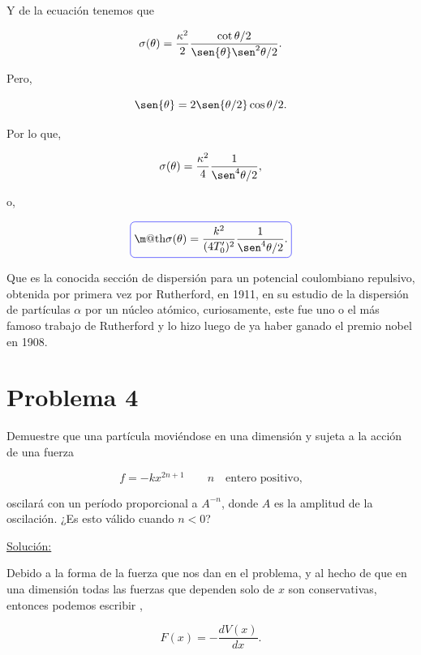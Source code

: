 \documentclass[a4paper,10pt]{article}
\makeatletter
\numberwithin{equation}{section}
\newcommand*{\boxcolor}{blue}
\renewcommand{\boxed}[1]{\textcolor{\boxcolor}{%
\tikz[baseline={([yshift=-1ex]current bounding box.center)}] \node [rectangle, minimum width=1ex,rounded corners,draw] {\normalcolor\m@th$\displaystyle#1$};}}
\makeatother
\begin{document}
Y de la ecuación  tenemos que 

\begin{equation}
 \sigma (\theta) = \frac{\kappa^2}{2}\frac{\cot{\theta/2}}{\sen{\theta}\sen^2{\theta/2}}.
\end{equation}

Pero,

\begin{equation}
 \sen{\theta} = 2\sen{\theta/2}\cos{\theta/2}.
\end{equation}

Por lo que,

\begin{equation}
  \sigma (\theta) = \frac{\kappa^2}{4}\frac{1}{\sen^4{\theta/2}},
\end{equation}

o,

\begin{equation}
 \boxed{\sigma (\theta) = \frac{k^2}{(4T_0')^2}\frac{1}{\sen^4{\theta/2}}.}
\end{equation}

Que es la conocida sección de dispersión para un potencial coulombiano repulsivo,
obtenida por primera vez por Rutherford, en 1911, en su estudio de la dispersión de 
partículas $\alpha$ por un núcleo atómico, curiosamente, este fue uno o el más famoso
trabajo de Rutherford y lo hizo luego de ya haber ganado el premio nobel en 1908.

\section{Problema 4}

Demuestre que una partícula moviéndose en una dimensión y sujeta a la 
acción de una fuerza 

$$ 
f = -kx^{2n+1} \qquad n \quad \text{entero positivo,}
$$

oscilará con un período proporcional a $A^{-n}$, donde $A$ es la amplitud 
de la oscilación. ¿Es esto válido cuando $n<0$?

\vspace{.3cm}

\underline{Solución:} \vspace{.3cm}

Debido a la forma de la fuerza que nos dan en el problema, y al hecho de que en una 
dimensión todas las fuerzas que dependen solo de $x$ son conservativas, entonces 
podemos escribir \cite{saletan},

\begin{equation}
 F(x) = - \frac{dV(x)}{dx}.
 \label{eq:potencial1}
\end{equation}
\end{document}
